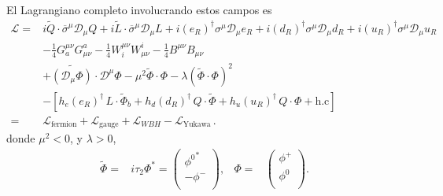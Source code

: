 \begin{frame}
El Lagrangiano completo involucrando estos campos es
\begin{align}
     \mathcal{L}=&i\widetilde{Q}\cdot \overline{\sigma}^\mu\mathcal{D}_\mu Q+i\widetilde{L}\cdot \overline{\sigma}^\mu\mathcal{D}_\mu L+
i(e_R)^{\dagger}\sigma^\mu\mathcal{D}_\mu {e_R}+i(d_R)^{\dagger}\sigma^\mu\mathcal{D}_\mu {d_R}+i(u_R)^{\dagger}\sigma^\mu\mathcal{D}_\mu {u_R}
\nonumber\\
     &-\tfrac{1}{4}G^{\mu\nu}_a G_{\mu\nu}^a-\tfrac{1}{4}W^{\mu\nu}_i W_{\mu\nu}^i-\tfrac{1}{4}B^{\mu\nu} B_{\mu\nu}\nonumber\\
     &+\widetilde{\left( \mathcal{D}_\mu{\Phi} \right)}\cdot\mathcal{D}^\mu\Phi-\mu^2\widetilde{\Phi}\cdot\Phi-\lambda \left( \widetilde{\Phi}\cdot\Phi \right)^2\nonumber\\
     &- \left[  h_e \left( e_R \right)^{\dagger}\,L\cdot \widetilde{\Phi}_b +
      h_d \left( d_R \right)^{\dagger}\,Q\cdot \widetilde{\Phi} +
      h_u \left( u_R \right)^{\dagger}\,Q\cdot {\Phi}+\text{h.c}\right]\nonumber\\
     =&\mathcal{L}_{\text{fermion}}+\mathcal{L}_{\text{gauge}}
     +\mathcal{L}_{WBH}
     -\mathcal{L}_{\text{Yukawa}}\,.
\end{align}
donde $\mu^2<0$, y $\lambda>0$,
\begin{align}
  \widetilde{\Phi}=&i\tau_2\Phi^* 
=\begin{pmatrix}
{\phi^0}^{*}\\
-  \phi^-\\
\end{pmatrix}, &   \Phi=&
  \begin{pmatrix}
    \phi^+\\
    \phi^0\\
  \end{pmatrix}.
\end{align}

\end{frame}
